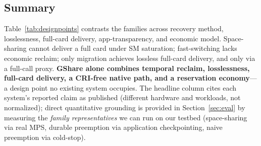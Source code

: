 \documentclass[preprint,12pt]{elsarticle}
\begin{document}
\subsection{Summary}
Table~\ref{tab:designpoints} contrasts the families across recovery method, losslessness, full-card
delivery, app-transparency, and economic model. Space-sharing cannot deliver a full card under SM
saturation; fast-switching lacks economic reclaim; only migration achieves lossless full-card delivery, and
only via a full-call proxy. \textbf{GShare alone combines temporal reclaim, losslessness, full-card
delivery, a CRI-free native path, and a reservation economy}---a design point no existing system occupies.
The headline column cites each system's reported claim as published (different hardware and workloads, not
normalized); direct quantitative grounding is provided in Section~\ref{sec:eval} by measuring the
\emph{family representatives} we can run on our testbed (space-sharing via real MPS, durable preemption via
application checkpointing, naive preemption via cold-stop).
\end{document}
